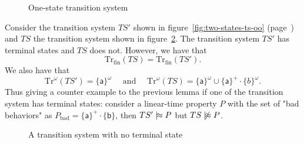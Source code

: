 \documentclass[./main]{subfiles}
\begin{document}
  \begin{figure}
    \centering
    \caption{One-state transition system}
    \label{fig:one-state-ts}
  \end{figure}

  \begin{en-exm}
    Consider the transition system $TS'$ shown in figure~\ref{fig:two-states-ts-oo} (page~\pageref{fig:two-states-ts-oo}) and $TS$ the transition system shown in figure~\ref{fig:two-states-ts-loop}.
    The transition system $TS'$ has terminal states and $TS$ does not. However, we have that
    \[
    \mathrm{Tr}_\mathrm{fin}(TS) = \mathrm{Tr}_\mathrm{fin}(TS')
    .\]
    We also have that \[
    \mathrm{Tr}^\omega(TS') = \{\mathsf{a}\}^\omega \quad \text{ and }\quad \mathrm{Tr}^\omega(TS) = \{\mathsf{a}\}^\omega \cup \{\mathsf{a}\}^+ \cdot \{b\}^\omega
    .\] 
    Thus giving a counter example to the previous lemma if one of the transition system has terminal states: consider a linear-time property $P$ with the set of "bad behaviors" as $P_\mathrm{bad} = \{\mathsf{a}\}^+ \cdot \{\mathsf{b}\}$, then $TS' \mathrel{{|}\!{\approx}} P$ but  $TS \nmd P$.
  \end{en-exm}

  \begin{figure}
    \centering
    \caption{A transition system with no terminal state}
    \label{fig:two-states-ts-loop}
  \end{figure}
\end{document}
